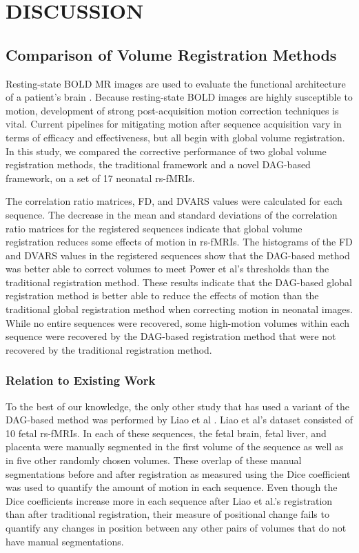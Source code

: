\chapter{DISCUSSION}
\label{ch:discussion}

\section{Comparison of Volume Registration Methods}

Resting-state BOLD MR images are used to evaluate the functional architecture of a patient’s brain . Because resting-state BOLD images are highly susceptible to motion, development of strong post-acquisition motion correction techniques is vital. Current pipelines for mitigating motion after sequence acquisition vary in terms of efficacy and effectiveness, but all begin with global volume registration. In this study, we compared the corrective performance of two global volume registration methods, the traditional framework and a novel DAG-based framework, on a set of 17 neonatal rs-fMRIs. 

The correlation ratio matrices, FD, and DVARS values were calculated for each sequence. The decrease in the mean and standard deviations of the correlation ratio matrices for the registered sequences indicate that global volume registration reduces some effects of motion in rs-fMRIs. The histograms of the FD and DVARS values in the registered sequences show that the DAG-based method was better able to correct volumes to meet Power et al’s thresholds than the traditional registration method. These results indicate that the DAG-based global registration method is better able to reduce the effects of motion than the traditional global registration method when correcting motion in neonatal images. While no entire sequences were recovered, some high-motion volumes within each sequence were recovered by the DAG-based registration method that were not recovered by the traditional registration method. 

\subsection{Relation to Existing Work}
To the best of our knowledge, the only other study that has used a variant of the DAG-based method was performed by Liao et al \cite{Liao2016}. Liao et al’s dataset consisted of 10 fetal rs-fMRIs. In each of these sequences, the fetal brain, fetal liver, and placenta were manually segmented in the first volume of the sequence as well as in five other randomly chosen volumes. These overlap of these manual segmentations before and after registration as measured using the Dice coefficient was used to quantify the amount of motion in each sequence. Even though the Dice coefficients increase more in each sequence after Liao et al.’s registration than after traditional registration, their measure of positional change fails to quantify any changes in position between any other pairs of volumes that do not have manual segmentations. 

